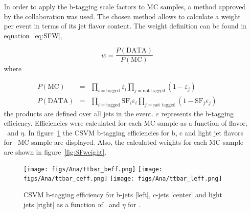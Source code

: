 In order to apply the b-tagging scale factors to MC samples, a method approved by the collaboration was used. The chosen method allows to calculate a weight per event in terms of its jet flavor content. The weight definition can be found in equation~\ref{eq:SFW}, 

\begin{equation}
  \label{eq:SFW}
  w=\frac{P(\text{DATA})}{P(\text{MC})}
\end{equation}where

\begin{eqnarray}
  \label{eq:DataMCSFP}
  P(\text{MC}) & = & \prod_{i=\text{tagged}} \varepsilon_i \prod_{j=\text{not tagged}} (1-\varepsilon_j) \\
  P(\text{DATA}) & = & \prod_{i=\text{tagged}} \text{SF}_i \varepsilon_i \prod_{j=\text{not tagged}} (1-\text{SF}_j \varepsilon_j)
\end{eqnarray}the products are defined over all jets in the event. $\varepsilon$ represents the b-tagging efficiency. Efficiencies were calculated for each MC sample as a function of flavor, \pt~and $\eta$. In figure~\ref{fig:ttbarBEff} the CSVM b-tagging efficiencies for b, c and light jet flavors for \ttbar~MC sample are displayed. Also, the calculated weights for each MC sample are shown in figure~\ref{fig:SFweight}. 


\begin{figure}[!Hhtbp]
  \begin{center}
    \texttt{[image: figs/Ana/ttbar\_beff.png]}
    \texttt{[image: figs/Ana/ttbar\_ceff.png]}
    \texttt{[image: figs/Ana/ttbar\_leff.png]}
    \caption{CSVM b-tagging efficiency for b-jets [left], c-jets [center] and light jets [right] as a function of \pt~and $\eta$ for \ttbar.}
    \label{fig:ttbarBEff}
  \end{center}
\end{figure}

